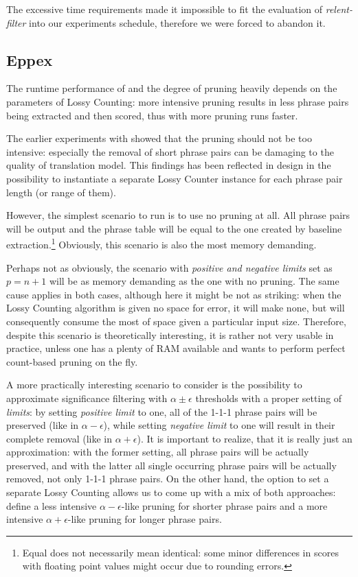 The excessive time requirements made it impossible to fit the evaluation of \emph{relent-filter}
into our experiments schedule, therefore we were forced to abandon it.

\subsection{Eppex}

The runtime performance of \eppex{} and the degree of pruning heavily depends
on the parameters of Lossy Counting: more intensive pruning results in less phrase pairs
being extracted and then scored, thus with more pruning \eppex{} runs faster.

The earlier experiments with \eppex{} \citep{przywara:eppex} showed that the pruning
should not be too intensive: especially the removal of short phrase pairs can be
damaging to the quality of translation model.
This findings has been reflected in \eppex{} design in the possibility to instantiate
a separate Lossy Counter instance for each phrase pair length (or range of them).

However, the simplest scenario to run is to use no pruning at all.
All phrase pairs will be output and the phrase table will be equal to the one
created by baseline extraction.\footnote{Equal does not necessarily mean identical:
some minor differences in scores with floating point values might occur due to
rounding errors.}
Obviously, this scenario is also the most memory demanding.

Perhaps not as obviously, the scenario with \emph{positive and negative limits} set as
$p = n + 1$ will be as memory demanding as the one with no pruning.
The same cause applies in both cases, although here it might be not as striking:
when the Lossy Counting algorithm is given no space for error, it will make none,
but will consequently consume the most of space given a particular input size.
Therefore, despite this scenario is theoretically interesting, it is rather not very
usable in practice, unless one has a plenty of RAM available and wants to perform perfect
count-based pruning on the fly.

A more practically interesting scenario to consider is the possibility to approximate
significance filtering with $\alpha \pm \epsilon$ thresholds with a proper setting of
\emph{limits}: by setting \emph{positive limit} to one, all of the 1-1-1 phrase pairs
will be preserved (like in $\alpha - \epsilon$), while setting \emph{negative limit} to
one will result in their complete removal (like in $\alpha + \epsilon$).
It is important to realize, that it is really just an approximation:
with the former setting, all phrase pairs will be actually preserved,
and with the latter all single occurring phrase pairs will be actually removed,
not only 1-1-1 phrase pairs.
On the other hand, the option to set a separate Lossy Counting allows us to come up with
a mix of both approaches: define a less intensive $\alpha - \epsilon$-like pruning for
shorter phrase pairs and a more intensive $\alpha + \epsilon$-like pruning for longer
phrase pairs.

